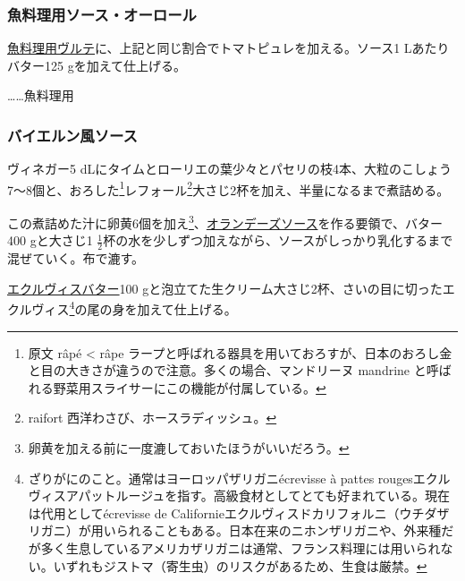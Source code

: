 \begin{recette}
\atoaki{}

\hypertarget{sauce-aurore-maigre}{%
\subsubsection{魚料理用ソース・オーロール}\label{sauce-aurore-maigre}}



\protect\hyperlink{veloute-de-poisson}{魚料理用ヴルテ}に、上記と同じ割合でトマトピュレを加える。ソース1
Lあたりバター125 gを加えて仕上げる。

\ldots{}\ldots{}魚料理用

\atoaki{}

\hypertarget{sauce-bavaroise}{%
\subsubsection{バイエルン風ソース}\label{sauce-bavaroise}}



ヴィネガー5
dLにタイムとローリエの葉少々とパセリの枝4本、大粒のこしょう7〜8個と、おろした\footnote{原文
  râpé \textless{} râpe
  ラープと呼ばれる器具を用いておろすが、日本のおろし金と目の大きさが違うので注意。多くの場合、マンドリーヌ
  mandrine と呼ばれる野菜用スライサーにこの機能が付属している。}レフォール\footnote{raifort
  西洋わさび、ホースラディッシュ。}大さじ2杯を加え、半量になるまで煮詰める。

この煮詰めた汁に卵黄6個を加え\footnote{卵黄を加える前に一度漉しておいたほうがいいだろう。}、\protect\hyperlink{sauce-hollandaise}{オランデーズソース}を作る要領で、バター400
gと大さじ1
\(\frac{1}{2}\)杯の水を少しずつ加えながら、ソースがしっかり乳化するまで混ぜていく。布で漉す。

\protect\hyperlink{beurre-d-ecrevisse}{エクルヴィスバター}100
gと泡立てた生クリーム大さじ2杯、さいの目に切ったエクルヴィス\footnote{ざりがにのこと。通常はヨーロッパザリガニécrevisse
  à pattes
  rougesエクルヴィスアパットルージュを指す。高級食材としてとても好まれている。現在は代用としてécrevisse
  de
  Californieエクルヴィスドカリフォルニ（ウチダザリガニ）が用いられることもある。日本在来のニホンザリガニや、外来種だが多く生息しているアメリカザリガニは通常、フランス料理には用いられない。いずれもジストマ（寄生虫）のリスクがあるため、生食は厳禁。}の尾の身を加えて仕上げる。


\end{recette}
